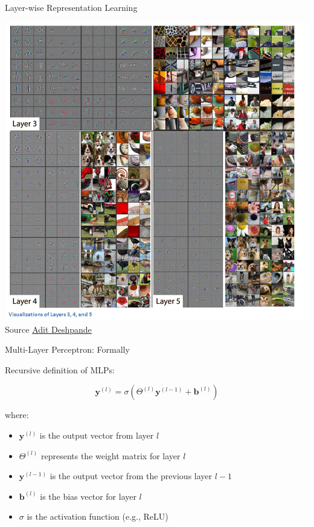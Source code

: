 \documentclass[aspectratio=169]{../latex_main/tntbeamer}  %
\begin{document}
        \begin{frame}{Layer-wise Representation Learning}

            \centering
            \includegraphics[width=0.42\linewidth]{075_deep_learning/figures/deconvnet2.png}\\
            Source \href{https://adeshpande3.github.io/The-9-Deep-Learning-Papers-You-Need-To-Know-About.html}{Adit Deshpande}
            
        \end{frame}

 	\begin{frame}{Multi-Layer Perceptron: Formally}

        Recursive definition of MLPs:

            \[
            \textbf{y}^{(l)} = \sigma({\Theta}^{(l)} \textbf{y}^{(l-1)} + \textbf{b}^{(l)})
            \]
            
            where:
            \begin{itemize}
                \item \( \textbf{y}^{(l)} \) is the output vector from layer \( l \)
                \item \( {\Theta}^{(l)} \) represents the weight matrix for layer \( l \)
                \item \( \textbf{y}^{(l-1)} \) is the output vector from the previous layer \( l-1 \)
                \item \( \textbf{b}^{(l)} \) is the bias vector for layer \( l \)
                \item \( \sigma \) is the activation function (e.g., ReLU)
            \end{itemize}
	\end{frame}
\end{document}
